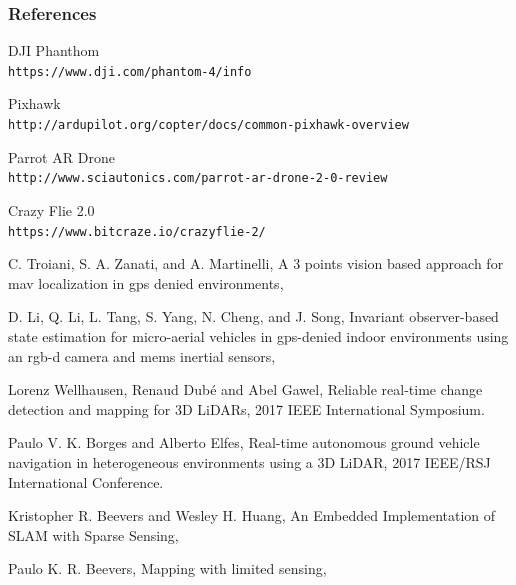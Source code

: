 \documentclass[xcolor=table]{beamer}
\begin{document}
\begin{frame}[allowframebreaks]
  \frametitle<presentation>{References}
    
  \begin{thebibliography}{10}
      
  \beamertemplatearticlebibitems 
    DJI Phanthom
    \\\texttt{https://www.dji.com/phantom-4/info}
    
    Pixhawk
    \\\texttt{http://ardupilot.org/copter/docs/common-pixhawk-overview}

    Parrot AR Drone
    \\\texttt{http://www.sciautonics.com/parrot-ar-drone-2-0-review}
    
    Crazy Flie 2.0
    \\\texttt{https://www.bitcraze.io/crazyflie-2/}      
  
    C. Troiani, S. A. Zanati, and A. Martinelli,
    \newblock A 3 points vision based approach for mav localization in gps denied environments,
    
    D. Li, Q. Li, L. Tang, S. Yang, N. Cheng, and J. Song,
    \newblock Invariant observer-based state estimation for micro-aerial vehicles in gps-denied indoor environments using an rgb-d camera and mems inertial sensors,

    Lorenz Wellhausen, Renaud Dubé and  Abel Gawel,
    \newblock Reliable real-time change detection and mapping for 3D LiDARs,
     2017 IEEE International Symposium. 

    Paulo V. K. Borges and Alberto Elfes,
    \newblock Real-time autonomous ground vehicle navigation in heterogeneous environments using a 3D LiDAR,
     2017 IEEE/RSJ International Conference. 

    Kristopher R. Beevers and Wesley H. Huang,
    \newblock An Embedded Implementation of SLAM with Sparse Sensing,
    
    Paulo K. R. Beevers,
    \newblock Mapping with limited sensing,
    
  \end{thebibliography}
  
\end{frame}
\end{document}
